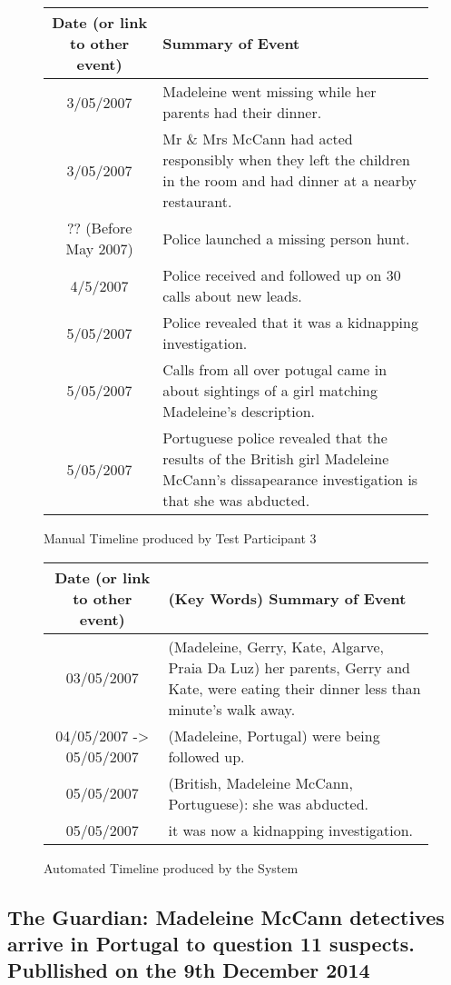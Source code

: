 \begin{figure}[H]
\begin{tabular}{|c|p{7cm}|}
\hline
Date (or link to other event) & Summary of Event\\
\hline
\hline
3/05/2007 & Madeleine went missing while her parents had their dinner.\\
\hline
3/05/2007 & Mr \& Mrs McCann had acted responsibly when they left the children in the room and had dinner at a nearby restaurant.\\
\hline
?? (Before May 2007) & Police launched a missing person hunt.\\
\hline
4/5/2007 & Police received and followed up on 30 calls about new leads.\\
\hline
5/05/2007 & Police revealed that it was a kidnapping investigation.\\
\hline
5/05/2007 & Calls from all over potugal came in about sightings of a girl matching Madeleine's description.\\
\hline
5/05/2007 & Portuguese police revealed that the results of the British girl Madeleine McCann's dissapearance investigation is that she was abducted.\\
\hline
\end{tabular}
\caption{Manual Timeline produced by Test Participant 3}
\end{figure}

\begin{figure}[H]
\begin{tabular}{|c|p{7cm}|}
\hline
Date (or link to other event) & (Key Words)  Summary of Event\\
\hline
\hline
03/05/2007& (Madeleine, Gerry, Kate, Algarve, Praia Da Luz) her parents, Gerry and Kate, were eating their dinner less than minute's walk away.\\
\hline
04/05/2007 -> 05/05/2007 & (Madeleine, Portugal) were being followed up.\\
\hline
05/05/2007 & (British, Madeleine McCann, Portuguese): she was abducted.\\
\hline
05/05/2007 & it was now a kidnapping investigation.\\
\hline
\end{tabular}
\caption{Automated Timeline produced by the System}
\end{figure}

\subsection{The Guardian: Madeleine McCann detectives arrive in Portugal to question 11 suspects. Publlished on the 9th December 2014}

